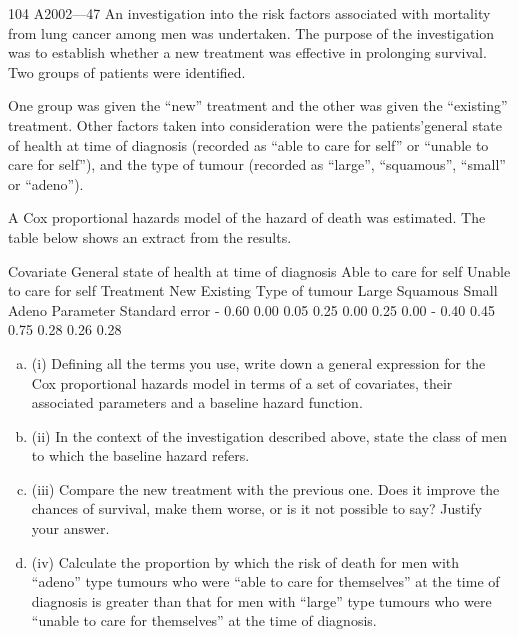 \documentclass[a4paper,12pt]{article}
\begin{document}
\begin{enumerate} 
 
104 A2002—47
An investigation into the risk factors associated with mortality from lung cancer
among men was undertaken. The purpose of the investigation was to establish whether a new treatment was effective in prolonging survival. Two groups of patients were identified. 

One group was given the “new” treatment and the other was given the “existing” treatment. Other factors taken into consideration were the patients’general state of health at time of diagnosis (recorded as “able to care for self” or “unable to care for self”), and the type of tumour (recorded as “large”, “squamous”, “small” or “adeno”).

A Cox proportional hazards model of the hazard of death was estimated. The table below shows an extract from the results.

Covariate
General state of health at time of diagnosis
Able to care for self
Unable to care for self
Treatment
New
Existing
Type of tumour
Large
Squamous
Small
Adeno
Parameter Standard error
- 0.60
0.00 0.05
0.25
0.00 0.25
0.00
- 0.40
0.45
0.75
0.28
0.26
0.28

\begin{enumerate}[(a)]
\item 
(i) Defining all the terms you use, write down a general expression for the Cox
proportional hazards model in terms of a set of covariates, their associated
parameters and a baseline hazard function.

\item 
(ii) In the context of the investigation described above, state the class of men to
which the baseline hazard refers.

\item 
(iii) Compare the new treatment with the previous one. Does it improve the
chances of survival, make them worse, or is it not possible to say? Justify
your answer.

\item 
(iv) Calculate the proportion by which the risk of death for men with “adeno” type
tumours who were “able to care for themselves” at the time of diagnosis is
greater than that for men with “large” type tumours who were “unable to care
for themselves” at the time of diagnosis.
\end{enumerate}

\newpage
\large



\end{enumerate}
\end{document}
